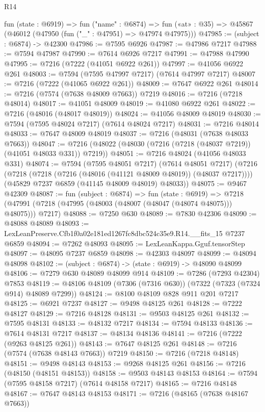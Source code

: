\begin{lexlean}{R14}
\begin{coremodule}
  fun (state : @6919) =>
  fun ("name" : @6874) =>
  fun («at» : @35) => @45867 (@46012 (@47950 (fun ("_" : @47951) => @47974 @47975)))
@47985 := (subject : @6874) -> @42300
@47986 := @7595 @6926
@47987 := @47986 @7217
@47988 := @7594 @47987
@47990 := @7614 @6926 @7217
@47991 := @47988 @47990
@47995 := @7216 (@7222 (@41051 @6922 @261))
@47997 := @41056 @6922 @261
@48003 := @7594 (@7595 @47997 @7217) (@7614 @47997 @7217)
@48007 := @7216 (@7222 (@41065 @6922 @261))
@48009 := @7647 @6922 @261
@48014 := @7216 (@7574 (@7638 @48009 @7663)) @7219
@48016 := @7216 (@7218 @48014)
@48017 := @41051 @48009
@48019 := @41080 @6922 @261
@48022 := @7216 (@48016 (@48017 @48019))
@48024 := @41056 @48009 @48019
@48030 := @7594 (@7595 @48024 @7217) (@7614 @48024 @7217)
@48031 := @7216 @48014
@48033 := @7647 @48009 @48019
@48037 := @7216 (@48031 (@7638 @48033 @7663))
@48047 := @7216 (@48022 (@48030 (@7216 (@7218 (@48037 @7219)) (@41051 @48033 @331)) @7219))
@48051 := @7216 @48024 (@41056 @48033 @331)
@48074 := @7594
    (@7595 @48051 @7217)
    (@7614 @48051 @7217)
    (@7216
      (@7218 (@7218 (@7216 (@48016 (@41121 @48009 @48019)) (@48037 @7217))))
      (@45829 @7237 @6859 (@41145 @48009 @48019) @48033))
@48075 := @9467 @42309
@48087 := fun (subject : @6874) =>
  fun (state : @6919) =>
  @7218 (@47991 (@7218 (@47995 (@48003 (@48007 (@48047 (@48074 @48075))) @48075))) @7217)
@48088 := @7250 @630
@48089 := @7830 @42306
@48090 := @48088 @48089
@48093 := LexLeanPreserve.Cfb1f0a02e181ed1267fc8dbc524c35e9.R14.__fits_15 @7237 @6859
@48094 := @7262 @48093
@48095 := LexLeanKappa.Gguf.tensorStep
@48097 := @48095 @7237 @6859
@48098 := @42303 @48097
@48099 := @48094 @48098
@48102 := (subject : @6874) -> (state : @6919) -> @48090 @48099
@48106 := @7279 @630 @48089 @48099 @914
@48109 := @7286 (@7293 @42304) @7853
@48119 := @48106 @48109 (@7306 (@7316 @630)) (@7322 (@7323 (@7324 @914) @48089 @7299))
@48124 := @8100 @48109 @828 @911 @201 @7217
@48125 := @6921 @7237
@48127 := @9498 @48125 @261
@48128 := @7222 @48127
@48129 := @7216 @48128
@48131 := @9503 @48125 @261
@48132 := @7595 @48131
@48133 := @48132 @7217
@48134 := @7594 @48133
@48136 := @7614 @48131 @7217
@48137 := @48134 @48136
@48141 := @7216 (@7222 (@9263 @48125 @261))
@48143 := @7647 @48125 @261
@48148 := @7216 (@7574 (@7638 @48143 @7663)) @7219
@48150 := @7216 (@7218 @48148)
@48151 := @9498 @48143
@48153 := @9268 @48125 @261
@48156 := @7216 (@48150 (@48151 @48153))
@48158 := @9503 @48143 @48153
@48164 := @7594 (@7595 @48158 @7217) (@7614 @48158 @7217)
@48165 := @7216 @48148
@48167 := @7647 @48143 @48153
@48171 := @7216 (@48165 (@7638 @48167 @7663))

\end{coremodule}
\end{lexlean}
